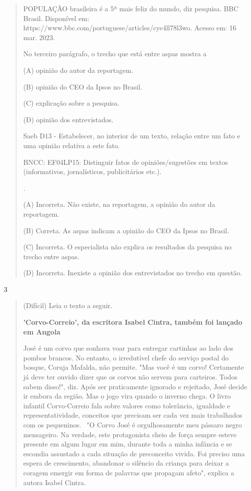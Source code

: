 \begin{itemize}
{{{\begin{itemize}
\begin{itemize}
\begin{itemize}
\begin{quote}
POPULAÇÃO brasileira é a 5ª mais feliz do mundo, diz pesquisa. BBC
Brasil. Disponível em:
https://www.bbc.com/portuguese/articles/cye4ll78l3wo. Acesso em: 16 mar.
2023.

\protect\hypertarget{_Hlk128058360}{}{}No terceiro parágrafo, o trecho
que está entre aspas mostra a

(A) opinião do autor da reportagem.

(B) opinião do CEO da Ipsos no Brasil.

(C) explicação sobre a pesquisa.

(D) opinião dos entrevistados.

Saeb D13 - Estabelecer, no interior de um texto, relação entre um fato e
uma opinião relativa a este fato.

BNCC: EF04LP15: Distinguir fatos de opiniões/sugestões em textos
(informativos, jornalísticos, publicitários etc.).

.

(A) Incorreta. Não existe, na reportagem, a opinião do autor da
reportagem.

(B) Correta. As aspas indicam a opinião do CEO da Ipsos no Brasil.

(C) Incorreta. O especialista não explica os resultados da pesquisa no
trecho entre aspas.

(D) Incorreta. Inexiste a opinião dos entrevistados no trecho em
questão.
\end{quote}

\num{3}

\begin{quote}
(Difícil) Leia o texto a seguir.

\protect\hypertarget{_Hlk129854304}{}{}\textbf{'Corvo-Correio', da
escritora Isabel Cintra, também foi lançado em Angola}

José é um corvo que sonhava voar para entregar cartinhas ao lado dos
pombos brancos. No entanto, o irredutível chefe do serviço postal do
bosque, Coruja Mafalda, não permite. "Mas você é um corvo! Certamente já
deve ter ouvido dizer que os corvos não servem para carteiros. Todos
sabem disso!", diz. Após ser praticamente ignorado e rejeitado, José
decide ir embora da região. Mas o jogo vira quando o inverno chega. O
livro infantil Corvo-Correio fala sobre valores como tolerância,
igualdade e representatividade, conceitos que precisam ser cada vez mais
trabalhados com os pequeninos\protect\hypertarget{_Hlk129854481}{}{}.
~"O Corvo José é orgulhosamente meu pássaro negro mensageiro. Na
verdade, este protagonista cheio de força sempre esteve presente em
algum lugar em mim, durante toda a minha infância e se escondia
assustado a cada situação de preconceito vivida. Foi preciso uma espera
de crescimento, abandonar o silêncio da criança para deixar a coragem
emergir em forma de palavras que propagam afeto", explica a autora
Isabel Cintra.~


\end{quote}
\end{itemize}
\end{itemize}
\end{itemize}}}}
\end{itemize}
